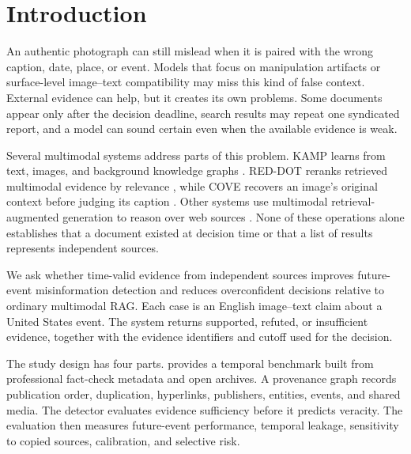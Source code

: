 \section{Introduction}

An authentic photograph can still mislead when it is paired with the wrong caption, date, place, or event. Models that focus on manipulation artifacts or surface-level image--text compatibility may miss this kind of false context. External evidence can help, but it creates its own problems. Some documents appear only after the decision deadline, search results may repeat one syndicated report, and a model can sound certain even when the available evidence is weak.

Several multimodal systems address parts of this problem. KAMP learns from text, images, and background knowledge graphs \cite{zhang2025kamp}. RED-DOT reranks retrieved multimodal evidence by relevance \cite{papadopoulos2025reddot}, while COVE recovers an image's original context before judging its caption \cite{tonglet2025cove}. Other systems use multimodal retrieval-augmented generation to reason over web sources \cite{khaliq2024ragar,kangur2025multireflect}. None of these operations alone establishes that a document existed at decision time or that a list of results represents independent sources.

We ask whether time-valid evidence from independent sources improves future-event misinformation detection and reduces overconfident decisions relative to ordinary multimodal RAG. Each case is an English image--text claim about a United States event. The system returns supported, refuted, or insufficient evidence, together with the evidence identifiers and cutoff used for the decision.

The study design has four parts. \datasetname{} provides a temporal benchmark built from professional fact-check metadata and open archives. A provenance graph records publication order, duplication, hyperlinks, publishers, entities, events, and shared media. The detector evaluates evidence sufficiency before it predicts veracity. The evaluation then measures future-event performance, temporal leakage, sensitivity to copied sources, calibration, and selective risk.

